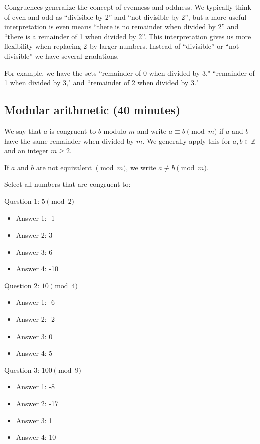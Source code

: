 \documentclass[letterpaper, 11 pt]{article}
\begin{document}
Congruences generalize the concept of evenness and oddness. We typically think of even and odd as ``divisible by 2'' and ``not divisible by 2'', but a more useful interpretation is even means ``there is no remainder when divided by 2'' and ``there is a remainder of 1 when divided by 2''. This interpretation gives us more flexibility when replacing $2$ by larger numbers. Instead of ``divisible'' or ``not divisible'' we have several gradations.


For example, we have the sets ``remainder of 0 when divided by 3," ``remainder of 1 when divided by 3," and ``remainder of 2 when divided by 3."

\subsection{Modular arithmetic (40 minutes)}


\begin{defn} We say that $a$ is congruent to $b$ modulo $m$ and write $a \equiv b \pmod{m}$ if $a$ and $b$ have the same remainder when divided by $m$. We generally apply this for $a,b\in \mathbb{Z}$ and an  integer $m \geq 2$. 

If $a$ and $b$ are not equivalent $\!\pmod{m}$, we write $a\nequiv b\pmod{m}$.
\end{defn}

\begin{poll}
 Select all numbers that are congruent to:
 
Question 1: $5 \pmod 2$
 
\begin{itemize}
\item Answer 1: -1
\item Answer 2: 3
\item Answer 3: 6
\item Answer 4: -10
\end{itemize}
Question 2: $10\pmod{4}$
 \begin{itemize}
\item Answer 1: -6
\item Answer 2: -2
\item Answer 3: 0
\item Answer 4: 5
\end{itemize}

Question 3: $100 \pmod 9$
\begin{itemize}
\item Answer 1: -8
\item Answer 2: -17
\item Answer 3: 1
\item Answer 4: 10
\end{itemize}
\end{poll}
\end{document}
